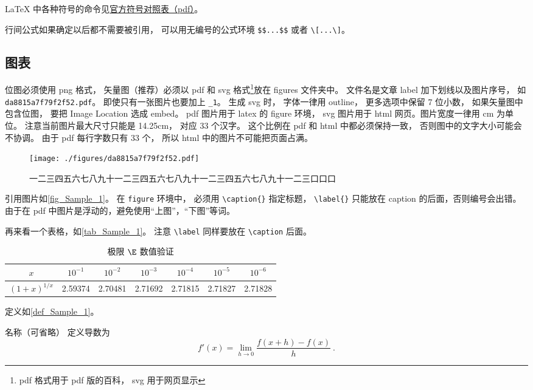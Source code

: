 LaTeX 中各种符号的命令见\href{https://tug.ctan.org/info/symbols/comprehensive/symbols-a4.pdf}{官方符号对照表（pdf）}。

行间公式如果确定以后都不需要被引用， 可以用无编号的公式环境 \verb`$$...$$` 或者 \verb`\[...\]`。

\subsection{图表}

位图必须使用 png 格式， 矢量图（推荐）必须以 pdf 和 svg 格式\footnote{pdf 格式用于 pdf 版的百科， svg 用于网页显示}放在 figures 文件夹中。 文件名是文章 label 加下划线以及图片序号， 如 \verb`da8815a7f79f2f52.pdf`。 即使只有一张图片也要加上 \verb`_1`。 生成 svg 时， 字体一律用 outline， 更多选项中保留 7 位小数， 如果矢量图中包含位图， 要把 Image Location 选成 embed。 pdf 图片用于 latex 的 figure 环境， svg 图片用于 html 网页。图片宽度一律用 cm 为单位。 注意当前图片最大尺寸只能是 14.25cm， 对应 33 个汉字。 这个比例在 pdf 和 html 中都必须保持一致， 否则图中的文字大小可能会不协调。 由于 pdf 每行字数只有 33 个， 所以 html 中的图片不可能把页面占满。
\begin{figure}[ht]
\centering
\texttt{[image: ./figures/da8815a7f79f2f52.pdf]}
\caption{一二三四五六七八九十一二三四五六七八九十一二三四五六七八九十一二三口口口} \label{fig_Sample_1}
\end{figure}
引用图片如\autoref{fig_Sample_1}。 在 \verb`figure` 环境中， 必须用 \verb`\caption{}` 指定标题， \verb`\label{}` 只能放在 caption 的后面，否则编号会出错。由于在 pdf 中图片是浮动的，避免使用“上图”，“下图”等词。

再来看一个表格，如\autoref{tab_Sample_1}。 注意 \verb`\label` 同样要放在 \verb`\caption` 后面。
\begin{table}[ht]
\centering
\caption{极限 $\E$ 数值验证}\label{tab_Sample_1}
\begin{tabular}{|c|c|c|c|c|c|c|}
\hline
$x$ & ${10^{ - 1}}$ & ${10^{ - 2}}$ & ${10^{ - 3}}$ & ${10^{ - 4}}$ & ${10^{ - 5}}$ & ${10^{ - 6}}$ \\
\hline
$(1 + x)^{1/x}$ & 2.59374 & 2.70481 & 2.71692 & 2.71815 & 2.71827 & 2.71828 \\
\hline
\end{tabular}
\end{table}

定义如\autoref{def_Sample_1}。
\begin{definition}{名称（可省略）}\label{def_Sample_1}
定义导数为
\begin{equation}
f'(x) = \lim_{h \to 0} \frac{f(x + h) - f(x)}{h}~.
\end{equation}
\end{definition}

